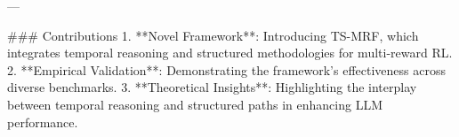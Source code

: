 ---

### Contributions
1. **Novel Framework**: Introducing TS-MRF, which integrates temporal reasoning and structured methodologies for multi-reward RL.
2. **Empirical Validation**: Demonstrating the framework’s effectiveness across diverse benchmarks.
3. **Theoretical Insights**: Highlighting the interplay between temporal reasoning and structured paths in enhancing LLM performance.


